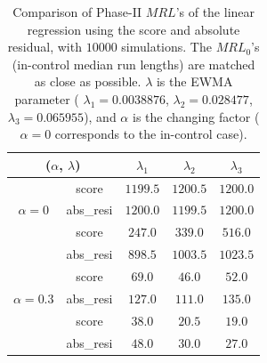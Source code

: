 \documentclass[twoside,11pt]{article}
\begin{document}
\begin{appendix}
\begin{table}[H]
\centering
\begin{tabular}{ccccc}
\toprule
\multicolumn{2}{c}{($ \alpha$, $ \lambda$)} & {$ \lambda_1$} & {$ \lambda_2$} & {$ \lambda_3$} \\
\midrule
\multirow{3}{*}{$ \alpha=0$} & score &$1199.5$ & $1200.5$ & $1200.0$ \\
& abs\_resi &$1200.0$ & $1199.5$ & $1200.0$ \\
\midrule
\multirow{3}{*}{$\alpha=0.1$} & score &$\bm{247.0}$ & $\bm{339.0}$ & $\bm{516.0}$ \\
& abs\_resi &$898.5$ & $1003.5$ & $1023.5$ \\
\midrule
\multirow{3}{*}{$\alpha=0.3$} & score &$\bm{69.0}$ & $\bm{46.0}$ & $\bm{52.0}$ \\
& abs\_resi &$127.0$ & $111.0$ & $135.0$ \\
\midrule
\multirow{3}{*}{$\alpha=0.5$} & score &$\bm{38.0}$ & $\bm{20.5}$ & $\bm{19.0}$ \\
& abs\_resi &$48.0$ & $30.0$ & $27.0$ \\
\midrule
\end{tabular}
\caption{Comparison of Phase-II $MRL$'s of the linear regression using the score and absolute residual, with $10000$ simulations. The $MRL_0$'s (in-control median run lengths) are matched as close as possible. $ \lambda$ is the EWMA parameter ( {$ \lambda_1 = 0.0038876$}, {$ \lambda_2 = 0.028477$}, {$ \lambda_3 =0.065955$}), and $ \alpha$ is the changing factor ($ \alpha=0$ corresponds to the in-control case).}
\label{tab:lin_MRL}
\end{table}



\end{appendix}
\end{document}
